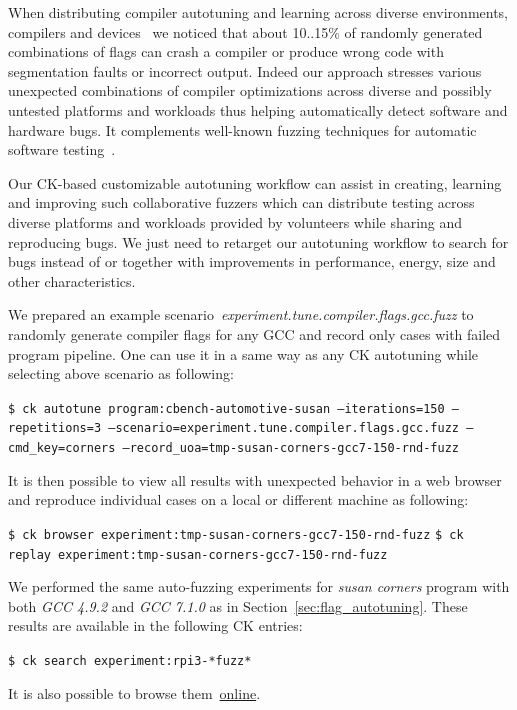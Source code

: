 When distributing compiler autotuning and learning across diverse environments, 
compilers and devices~\cite{Fur2009,cm:29db2248aba45e59:cd11e3a188574d80} 
we noticed that about 10..15\% of randomly generated combinations 
of flags can crash a compiler or produce wrong code with segmentation faults
or incorrect output.
%
Indeed our approach stresses various unexpected combinations 
of compiler optimizations across diverse and possibly untested platforms and workloads
thus helping automatically detect software and hardware bugs.
%
It complements well-known fuzzing techniques for automatic software 
testing~\cite{Duran:1981:RRT:800078.802530,Takanen:2008:FSS:1404500,Yang:2011:FUB:1993498.1993532}.

Our CK-based customizable autotuning workflow can assist in creating, 
learning and improving such collaborative fuzzers 
which can distribute testing across diverse platforms and workloads 
provided by volunteers while sharing and reproducing bugs.
%
We just need to retarget our autotuning workflow to search for
bugs instead of or together with improvements in performance, 
energy, size and other characteristics.

We prepared an example scenario~\emph{experiment.tune.compiler.flags.gcc.fuzz}
to randomly generate compiler flags for any GCC and record only cases
with failed program pipeline.
%
One can use it in a same way as any CK autotuning while selecting 
above scenario as following:

\begin{flushleft}
\texttt{\$ ck autotune program:cbench-automotive-susan --iterations=150 --repetitions=3 
  --scenario=experiment.tune.compiler.flags.gcc.fuzz
  --cmd\_key=corners --record\_uoa=tmp-susan-corners-gcc7-150-rnd-fuzz}
\end{flushleft}

It is then possible to view all results with unexpected behavior 
in a web browser and reproduce individual cases 
on a local or different machine as following: 

\begin{flushleft}
\texttt{\$ ck browser experiment:tmp-susan-corners-gcc7-150-rnd-fuzz}
\texttt{\$ ck replay experiment:tmp-susan-corners-gcc7-150-rnd-fuzz}
\end{flushleft}

We performed the same auto-fuzzing experiments for \textit{susan corners} program 
with both \textit{GCC 4.9.2} and \textit{GCC 7.1.0} as in Section~\ref{sec:flag_autotuning}.
%
These results are available in the following CK entries:
\begin{flushleft}
\texttt{\$ ck search experiment:rpi3-*fuzz*}
\end{flushleft}
%
It is also possible to browse them~\href{http://cknowledge.org/repo/web.php?wcid=experiment:rpi3-*fuzz*}{online}.


